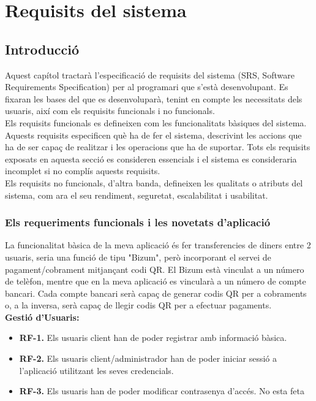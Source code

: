 \documentclass[a4paper,12pt,twoside]{ThesisStyle}
\begin{document}
\chapter{Requisits del sistema}
\label{chp:requisits}




\section{Introducció}
\label{subsec:Introducció}

Aquest capítol tractarà l'especificació de requisits del sistema (SRS, Software Requirements Specification) per al programari que s'està desenvolupant. Es fixaran les bases del que es desenvoluparà, tenint en compte les necessitats dels usuaris, així com els requisits funcionals i no funcionals.\\

Els requisits funcionals es defineixen com les funcionalitats bàsiques del sistema. Aquests requisits especificen què ha de fer el sistema, descrivint les accions que ha de ser capaç de realitzar i les operacions que ha de suportar. Tots els requisits exposats en aquesta secció es consideren essencials i el sistema es consideraria incomplet si no complís aquests requisits.\\

Els requisits no funcionals, d'altra banda, defineixen les qualitats o atributs del sistema, com ara el seu rendiment, seguretat, escalabilitat i usabilitat.\\




\subsection{Els requeriments funcionals i les novetats d'aplicació}
\label{subsec:Els requeriments funcionals i les novetats d'aplicació}


La funcionalitat bàsica de la meva aplicació és fer transferencies de diners entre 2 usuaris, 
seria una funció de tipu "Bizum", però incorporant el servei de pagament/cobrament mitjançant codi QR. El Bizum està vinculat a un número de telèfon, mentre que en la meva aplicació es vincularà a un número de compte bancari. Cada compte bancari serà capaç de generar codis QR per a cobraments o, a la inversa, serà capaç de llegir codis QR per a efectuar pagaments.\\



\textbf{Gestió d'Usuaris:}
\begin{itemize}
    \item \textbf{RF-1.} Els usuaris client han de poder registrar amb informació bàsica.
    \item \textbf{RF-2.} Els usuaris client/administrador han de poder iniciar sessió a l'aplicació utilitzant les seves credencials.
    \item \textbf{RF-3.} Els usuaris han de poder modificar contrasenya d'accés. No esta feta
\end{itemize}
\end{document}
